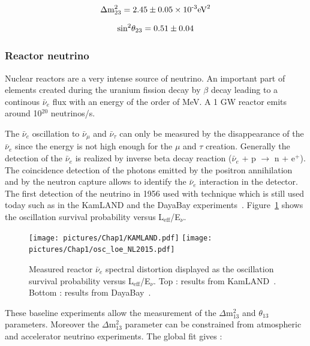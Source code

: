 \documentclass[main.tex]{subfiles}
\begin{document}
\begin{gather}
\Delta\text{m}_{\text{23}}^{\text{2}} = \text{2.45} \pm \text{0.05} \times \text{10}^{\text{\text{-3}}} \text{eV}^\text{2}
\nonumber\\[1.5ex]
\text{sin}^\text{2} \theta_{\text{23}} = \text{0.51} \pm \text{0.04} 
\end{gather} 




\FloatBarrier


\subsubsection{Reactor neutrino}


\NI Nuclear reactors are a very intense source of neutrino. An important part of elements created during the uranium fission decay by $\beta$ decay leading to a continous $\bar{\nu}_e$ flux with an energy of the order of MeV. A 1 GW reactor emits around 10$^\text{20}$ neutrinos/s. 


\bigskip


\NI The $\bar{\nu}_e$ oscillation to $\bar{\nu}_\mu$ and $\bar{\nu}_\tau$ can only be measured by the disappearance of the $\bar{\nu}_e$ since the energy is not high enough for the $\mu$ and $\tau$ creation. Generally the detection of the $\bar{\nu}_e$ is realized by inverse beta decay reaction ($\bar{\nu}_e$ + p $\rightarrow$ n + e$^+$). The coincidence detection of the photons emitted by the positron annihilation and by the neutron capture allows to identify the $\bar{\nu}_e$ interaction in the detector. The first detection of the neutrino in 1956 used with technique which is still used today such as in the KamLAND and the DayaBay experiments~\cite{KamLAND,DayaBay}. Figure~\ref{sec:ReactorNeutrinoExperiment} shows the oscillation survival probability versus L$_\text{eff}$/E$_\nu$.


\begin{figure}
\begin{center}
\texttt{[image: pictures/Chap1/KAMLAND.pdf]}
\texttt{[image: pictures/Chap1/osc\_loe\_NL2015.pdf]}
\caption{Measured reactor $\bar{\nu}_e$ spectral distortion displayed as the oscillation survival probability versus L$_\text{eff}$/E$_\nu$. Top : results from KamLAND~\cite{KamLAND}. Bottom : results from DayaBay~\cite{DayaBay}.}
\label{sec:ReactorNeutrinoExperiment}
\end{center}
\end{figure}


\NI These baseline experiments allow the measurement of the $\Delta$m$^\text{2}_\text{13}$ and $\theta_\text{13}$ parameters. Moreover the $\Delta$m$^\text{2}_\text{13}$ parameter can be constrained from atmospheric and accelerator neutrino experiments. The global fit gives :  
\end{document}
